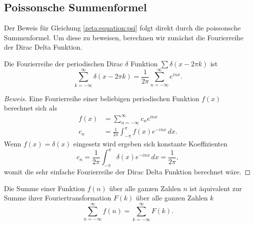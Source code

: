 \subsection{Poissonsche Summenformel} \label{zeta:subsec:poisson_summation}

Der Beweis für Gleichung \eqref{zeta:equation:psi} folgt direkt durch die poissonsche Summenformel.
Um diese zu beweisen, berechnen wir zunächst die Fourierreihe der Dirac Delta Funktion.

\begin{lemma}
    Die Fourierreihe der periodischen Dirac $\delta$ Funktion $\sum \delta(x - 2\pi k)$ ist
    \begin{equation} \label{zeta:equation:fourier_dirac}
        \sum_{k=-\infty}^{\infty}
        \delta(x - 2\pi k)
        =
        \frac{1}{2\pi}
        \sum_{n=-\infty}^{\infty}
        e^{i n x}.
    \end{equation}
\end{lemma}

\begin{proof}[Beweis]
    Eine Fourierreihe einer beliebigen periodischen Funktion $f(x)$ berechnet sich als
    \begin{align}
        f(x)
        &=
        \sum_{n=-\infty}^{\infty}
        c_n
        e^{i n x} \\
        c_n
        &=
        \frac{1}{2\pi}
        \int_{-\pi}^{\pi}
        f(x)
        e^{-i n x}
        \, dx.
    \end{align}
    Wenn $f(x)=\delta(x)$ eingesetz wird ergeben sich konstante Koeffizienten
    \begin{equation}
        c_n
        =
        \frac{1}{2\pi}
        \int_{-\pi}^{\pi}
        \delta(x)
        e^{-i n x}
        \, dx
        =
        \frac{1}{2\pi},
    \end{equation}
    womit die sehr einfache Fourierreihe der Dirac Delta Funktion berechnet wäre.
\end{proof}

\begin{satz}
    Die Summe einer Funktion $f(n)$ über alle ganzen Zahlen $n$ ist äquivalent zur Summe ihrer Fouriertransformation $F(k)$ über alle ganzen Zahlen $k$
    \begin{equation}
        \sum_{n=-\infty}^{\infty}
        f(n)
        =
        \sum_{k=-\infty}^{\infty}
        F(k).
    \end{equation}
\end{satz}

